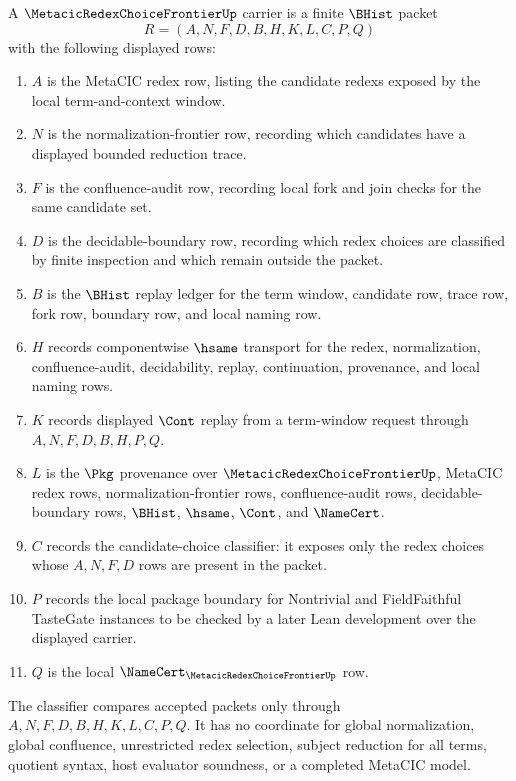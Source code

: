 \begin{definition}
\label{def:metacic-redex-choice-frontier-carrier}
A $\MetacicRedexChoiceFrontierUp$ carrier is a finite $\BHist$ packet
$$
R=(A,N,F,D,B,H,K,L,C,P,Q)
$$
with the following displayed rows:
\begin{enumerate}
\item $A$ is the MetaCIC redex row, listing the candidate redexs exposed by the local term-and-context window.
\item $N$ is the normalization-frontier row, recording which candidates have a displayed bounded reduction trace.
\item $F$ is the confluence-audit row, recording local fork and join checks for the same candidate set.
\item $D$ is the decidable-boundary row, recording which redex choices are classified by finite inspection and which remain outside the packet.
\item $B$ is the $\BHist$ replay ledger for the term window, candidate row, trace row, fork row, boundary row, and local naming row.
\item $H$ records componentwise $\hsame$ transport for the redex, normalization, confluence-audit, decidability, replay, continuation, provenance, and local naming rows.
\item $K$ records displayed $\Cont$ replay from a term-window request through $A,N,F,D,B,H,P,Q$.
\item $L$ is the $\Pkg$ provenance over $\MetacicRedexChoiceFrontierUp$, MetaCIC redex rows, normalization-frontier rows, confluence-audit rows, decidable-boundary rows, $\BHist$, $\hsame$, $\Cont$, and $\NameCert$.
\item $C$ records the candidate-choice classifier: it exposes only the redex choices whose $A,N,F,D$ rows are present in the packet.
\item $P$ records the local package boundary for Nontrivial and FieldFaithful TasteGate instances to be checked by a later Lean development over the displayed carrier.
\item $Q$ is the local $\NameCert_{\MetacicRedexChoiceFrontierUp}$ row.
\end{enumerate}
The classifier compares accepted packets only through $A,N,F,D,B,H,K,L,C,P,Q$. It has no coordinate for global normalization, global confluence, unrestricted redex selection, subject reduction for all terms, quotient syntax, host evaluator soundness, or a completed MetaCIC model.
\end{definition}

